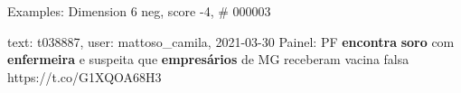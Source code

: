 \begin{frame}{Examples: Dimension 6 neg, score -4, \# 000003}
\footnotesize
\begin{alertblock}{text: t038887, user: mattoso\_camila, 2021-03-30}
Painel: PF \textbf{encontra} \textbf{soro} com \textbf{enfermeira} e suspeita 
que \textbf{empresários} de MG receberam vacina falsa https://t.co/G1XQOA68H3 
\end{alertblock}
\end{frame}
